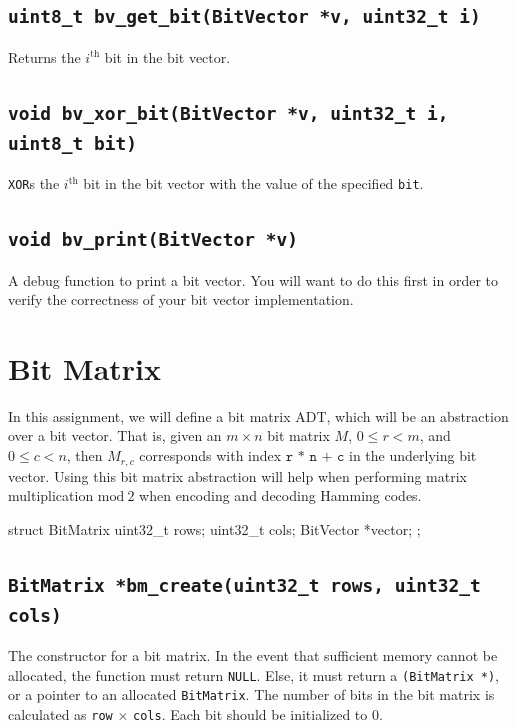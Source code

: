 \documentclass[11pt]{article}
\begin{document}
\subsection{\texttt{uint8\_t bv\_get\_bit(BitVector *v, uint32\_t i)}}

Returns the $i^\text{th}$ bit in the bit vector.

\subsection{\texttt{void bv\_xor\_bit(BitVector *v, uint32\_t i, uint8\_t bit)}}

\texttt{XOR}s the $i^\text{th}$ bit in the bit vector with the value of
the specified \texttt{bit}.

\subsection{\texttt{void bv\_print(BitVector *v)}}

A debug function to print a bit vector. You will want to do this first
in order to verify the correctness of your bit vector implementation.

\section{Bit Matrix}

In this assignment, we will define a bit matrix ADT, which will be an
abstraction over a bit vector. That is, given an $m \times n$ bit matrix
$M$, $0 \leq r < m$, and $0 \leq c < n$, then $M_{r, c}$ corresponds
with index $\texttt{r * n + c}$ in the underlying bit vector. Using this
bit matrix abstraction will help when performing matrix multiplication
$\mathrm{mod}\ 2$ when encoding and decoding Hamming codes.

\begin{codelisting}{}
struct BitMatrix {
    uint32_t rows;
    uint32_t cols;
    BitVector *vector;
};
\end{codelisting}

\subsection{\texttt{BitMatrix *bm\_create(uint32\_t rows, uint32\_t cols)}}

The constructor for a bit matrix. In the event that sufficient memory
cannot be allocated, the function must return \texttt{NULL}. Else, it
must return a \texttt{(BitMatrix *)}, or a pointer to an allocated
\texttt{BitMatrix}. The number of bits in the bit matrix is calculated
as \texttt{row} $\times$ \texttt{cols}. Each bit should be initialized
to 0.
\end{document}
